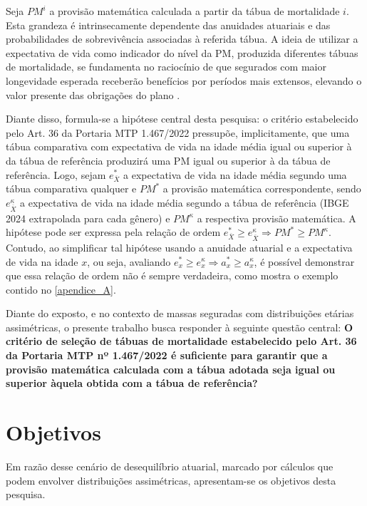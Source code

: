 Seja $PM^{i}$ a provisão matemática calculada a partir da tábua de mortalidade $i$. Esta grandeza é intrinsecamente dependente das anuidades atuariais e das probabilidades de sobrevivência associadas à referida tábua. A ideia de utilizar a expectativa de vida como indicador do nível da PM, produzida diferentes tábuas de mortalidade, se fundamenta no raciocínio de que segurados com maior longevidade esperada receberão benefícios por períodos mais extensos, elevando o valor presente das obrigações do plano \cite{silveira_santos_2017}.

Diante disso, formula-se a hipótese central desta pesquisa: o critério estabelecido pelo Art. 36 da Portaria MTP 1.467/2022 pressupõe, implicitamente, que uma tábua comparativa com expectativa de vida na idade média igual ou superior à da tábua de referência produzirá uma PM igual ou superior à da tábua de referência. Logo, sejam $e^{*}_{\overline{X}}$ a expectativa de vida na idade média segundo uma tábua comparativa qualquer e $PM^{*}$ a provisão matemática correspondente, sendo $e^{\kappa}_{\overline{X}}$ a expectativa de vida na idade média segundo a tábua de referência (IBGE 2024 extrapolada para cada gênero) e $PM^{\kappa}$ a respectiva provisão matemática. A hipótese pode ser expressa pela relação de ordem $e^{*}_{\overline{X}} \geq e^{\kappa}_{\overline{X}} \Rightarrow PM^{*} \geq PM^{\kappa}$. Contudo, ao simplificar tal hipótese usando a anuidade atuarial e a expectativa de vida na idade $x$, ou seja, avaliando $e^{*}_{x} \geq e^{\kappa}_{x} \Rightarrow a^{*}_{x} \geq a^{\kappa}_{x}$, é possível demonstrar que essa relação de ordem não é sempre verdadeira, como mostra o exemplo contido no \ref{apendice_A}.

Diante do exposto, e no contexto de massas seguradas com distribuições etárias assimétricas, o presente trabalho busca responder à seguinte questão central: \textbf{O critério de seleção de tábuas de mortalidade estabelecido pelo Art. 36 da Portaria MTP nº 1.467/2022 é suficiente para garantir que a provisão matemática calculada com a tábua adotada seja igual ou superior àquela obtida com a tábua de referência?}

\section{\textbf{Objetivos}}
Em razão desse cenário de desequilíbrio atuarial, marcado por cálculos que podem envolver distribuições assimétricas, apresentam-se os objetivos desta pesquisa.

